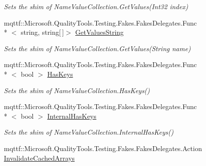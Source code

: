 \begin{DoxyCompactItemize}
\begin{DoxyCompactList}\small\item\em Sets the shim of Name\-Value\-Collection.\-Get\-Values(\-Int32 index)\end{DoxyCompactList}\item 
mqttf\-::\-Microsoft.\-Quality\-Tools.\-Testing.\-Fakes.\-Fakes\-Delegates.\-Func\\*
$<$ string, string\mbox{[}$\,$\mbox{]}$>$ \hyperlink{class_system_1_1_collections_1_1_specialized_1_1_fakes_1_1_shim_name_value_collection_adfc5c9f3db718b9aa7e0c01663574b1e}{Get\-Values\-String}
\begin{DoxyCompactList}\small\item\em Sets the shim of Name\-Value\-Collection.\-Get\-Values(\-String name)\end{DoxyCompactList}\item 
mqttf\-::\-Microsoft.\-Quality\-Tools.\-Testing.\-Fakes.\-Fakes\-Delegates.\-Func\\*
$<$ bool $>$ \hyperlink{class_system_1_1_collections_1_1_specialized_1_1_fakes_1_1_shim_name_value_collection_a27f4476d096b6c2ba6c86ee125069ecd}{Has\-Keys}
\begin{DoxyCompactList}\small\item\em Sets the shim of Name\-Value\-Collection.\-Has\-Keys()\end{DoxyCompactList}\item 
mqttf\-::\-Microsoft.\-Quality\-Tools.\-Testing.\-Fakes.\-Fakes\-Delegates.\-Func\\*
$<$ bool $>$ \hyperlink{class_system_1_1_collections_1_1_specialized_1_1_fakes_1_1_shim_name_value_collection_a6c8d87337feea10337011d4aaa8fe3e3}{Internal\-Has\-Keys}
\begin{DoxyCompactList}\small\item\em Sets the shim of Name\-Value\-Collection.\-Internal\-Has\-Keys()\end{DoxyCompactList}\item 
mqttf\-::\-Microsoft.\-Quality\-Tools.\-Testing.\-Fakes.\-Fakes\-Delegates.\-Action \hyperlink{class_system_1_1_collections_1_1_specialized_1_1_fakes_1_1_shim_name_value_collection_a2a3e86bbc2e7152a72eb70ec94097eec}{Invalidate\-Cached\-Arrays}

\end{DoxyCompactItemize}
